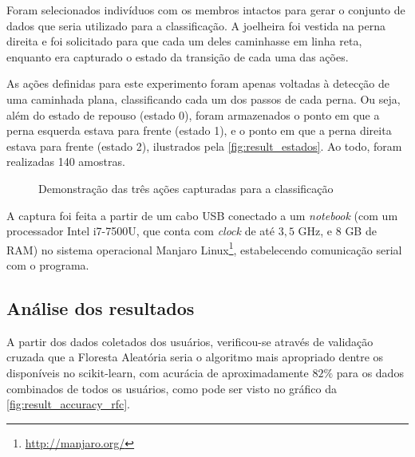 Foram selecionados indivíduos com os membros intactos para gerar o conjunto de dados que seria utilizado para a classificação. A joelheira foi vestida na perna direita e foi solicitado para que cada um deles caminhasse em linha reta, enquanto era capturado o estado da transição de cada uma das ações.

As ações definidas para este experimento foram apenas voltadas à detecção de uma caminhada plana, classificando cada um dos passos de cada perna. Ou seja, além do estado de repouso (estado 0), foram armazenados o ponto em que a perna esquerda estava para frente (estado 1), e o ponto em que a perna direita estava para frente (estado 2), ilustrados pela \autoref{fig:result_estados}. Ao todo, foram realizadas 140 amostras.

\begin{figure}[ht]
	\caption{\label{fig:result_estados}Demonstração das três ações capturadas para a classificação}
	\begin{center}
	\end{center}
\end{figure}

A captura foi feita a partir de um cabo USB conectado a um \textit{notebook} (com um processador Intel i7-7500U, que conta com \textit{clock} de até \(3{,}5\) GHz, e \(8\) GB de RAM) no sistema operacional Manjaro Linux\footnote{\url{http://manjaro.org/}}, estabelecendo comunicação serial com o programa.

\subsection{Análise dos resultados}\label{sec:result_analise}

A partir dos dados coletados dos usuários, verificou-se através de validação cruzada que a Floresta Aleatória seria o algoritmo mais apropriado dentre os disponíveis no scikit-learn, com acurácia de aproximadamente \(82\%\) para os dados combinados de todos os usuários, como pode ser visto no gráfico da \autoref{fig:result_accuracy_rfc}.

